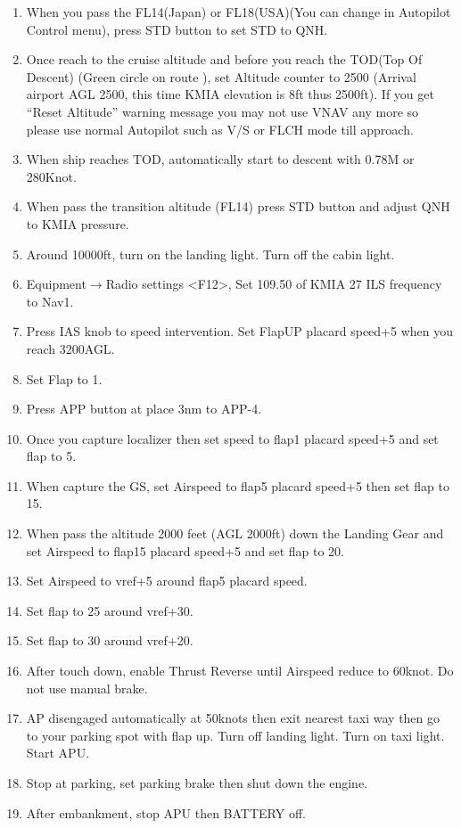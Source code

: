 \begin{enumerate}
\item When you pass the FL14(Japan) or FL18(USA)(You can change in Autopilot Control menu), press STD button to set STD to QNH.
\item Once reach to the cruise altitude and before you reach the TOD(Top Of Descent) (Green circle on route ), set Altitude counter to 2500 (Arrival airport AGL 2500, this time KMIA elevation is 8ft thus 2500ft). If you get “Reset Altitude” warning message you may not use VNAV any more so please use normal Autopilot such as V/S or FLCH mode till approach.
\item When ship reaches TOD, automatically start to descent with 0.78M or 280Knot.
\item When pass the transition altitude (FL14) press STD button and adjust QNH to KMIA pressure.
\item Around 10000ft, turn on the landing light. Turn off the cabin light.
\item Equipment$\rightarrow$Radio settings <F12>, Set 109.50 of KMIA 27 ILS frequency to Nav1.
\item Press IAS knob to speed intervention. Set FlapUP placard speed+5 when you reach 3200AGL.
\item Set Flap to 1.
\item Press APP button at place 3nm to APP-4.
\item Once you capture localizer then set speed to flap1 placard speed+5 and set flap to 5.
\item When capture the GS, set Airspeed to flap5 placard speed+5 then set flap to 15.
\item When pass the altitude 2000 feet (AGL 2000ft) down the Landing Gear and set Airspeed to flap15 placard speed+5 and set flap to 20.
\item Set Airspeed to vref+5 around flap5 placard speed.
\item Set flap to 25 around vref+30.
\item Set flap to 30 around vref+20.
\item After touch down, enable Thrust Reverse until Airspeed reduce to 60knot. Do not use manual brake.
\item AP disengaged automatically at 50knots then exit nearest taxi way then go to your parking spot with flap up. Turn off landing light. Turn on taxi light. Start APU.
\item Stop at parking, set parking brake then shut down the engine.
\item After embankment, stop APU then BATTERY off.
\end{enumerate}
